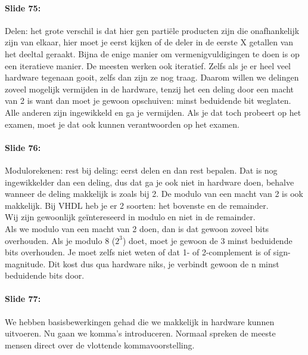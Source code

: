 \documentclass[10pt,a4paper]{book}
\begin{document}
\paragraph{Slide 75:} Delen: het grote verschil is dat hier gen parti\"ele producten zijn die onafhankelijk zijn van elkaar, hier moet je eerst kijken of de deler in de eerste X getallen van het deeltal geraakt. Bijna de enige manier om vermenigvuldigingen te doen is op een iteratieve manier. De meesten werken ook iteratief. Zelfs als je er heel veel hardware tegenaan gooit, zelfs dan zijn ze nog traag. Daarom willen we delingen zoveel mogelijk vermijden in de hardware, tenzij het een deling door een macht van 2 is want dan moet je gewoon opschuiven: minst beduidende bit weglaten. Alle anderen zijn ingewikkeld en ga je vermijden. Als je dat toch probeert op het examen, moet je dat ook kunnen verantwoorden op het examen.

\paragraph{Slide 76:} Modulorekenen: rest bij deling: eerst delen en dan rest bepalen. Dat is nog ingewikkelder dan een deling, dus dat ga je ook niet in hardware doen, behalve wanneer de deling makkelijk is zoals bij 2. De modulo van een macht van 2 is ook makkelijk. Bij VHDL heb je er 2 soorten: het bovenste en de remainder.\\
Wij zijn gewoonlijk ge\"intereseerd in modulo en niet in de remainder.\\
Als we modulo van een macht van 2 doen, dan is dat gewoon zoveel bits overhouden. Als je modulo 8 ($2^3$) doet, moet je gewoon de 3 minst beduidende bits overhouden. Je moet zelfs niet weten of dat 1- of 2-complement is of sign-magnitude. Dit kost dus qua hardware niks, je verbindt gewoon de n minst beduidende bits door.

\paragraph{Slide 77:} We hebben basisbewerkingen gehad die we makkelijk in hardware kunnen uitvoeren. Nu gaan we komma's introduceren. Normaal spreken de meeste mensen direct over de vlottende kommavoorstelling. 
\end{document}
